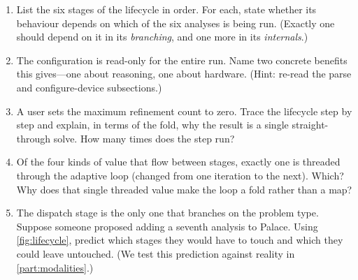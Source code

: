 \exercisessection
\begin{enumerate}[nosep]
  \item List the six stages of the lifecycle in order. For each, state whether
  its behaviour depends on which of the six analyses is being run. (Exactly one
  should depend on it in its \emph{branching}, and one more in its
  \emph{internals}.)
  \item The configuration is read-only for the entire run. Name two concrete
  benefits this gives---one about reasoning, one about hardware. (Hint: re-read
  the parse and configure-device subsections.)
  \item A user sets the maximum refinement count to zero. Trace the lifecycle
  step by step and explain, in terms of the fold, why the result is a single
  straight-through solve. How many times does the step run?
  \item Of the four kinds of value that flow between stages, exactly one is
  threaded through the adaptive loop (changed from one iteration to the next).
  Which? Why does that single threaded value make the loop a fold rather than a
  map?
  \item The dispatch stage is the only one that branches on the problem type.
  Suppose someone proposed adding a seventh analysis to Palace. Using
  \cref{fig:lifecycle}, predict which stages they would have to touch and which
  they could leave untouched. (We test this prediction against reality in
  \cref{part:modalities}.)
\end{enumerate}
